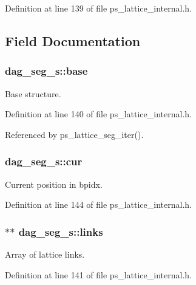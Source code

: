 \-Definition at line 139 of file ps\-\_\-lattice\-\_\-internal.\-h.



\subsection{\-Field \-Documentation}
\subsubsection[{base}]{ {\bf dag\-\_\-seg\-\_\-s\-::base}}\label{structdag__seg__s_a72f90e137c1f83ab3df6ecd5e1b6dc71}


\-Base structure. 



\-Definition at line 140 of file ps\-\_\-lattice\-\_\-internal.\-h.



\-Referenced by ps\-\_\-lattice\-\_\-seg\-\_\-iter().

\subsubsection[{cur}]{ {\bf dag\-\_\-seg\-\_\-s\-::cur}}\label{structdag__seg__s_a0fed697e06d12e5a0405fdcb0d97faf1}


\-Current position in bpidx. 



\-Definition at line 144 of file ps\-\_\-lattice\-\_\-internal.\-h.

\subsubsection[{links}]{$\ast$$\ast$ {\bf dag\-\_\-seg\-\_\-s\-::links}}\label{structdag__seg__s_a5fcc22d787e4db1bdc728ff8faead738}


\-Array of lattice links. 



\-Definition at line 141 of file ps\-\_\-lattice\-\_\-internal.\-h.



